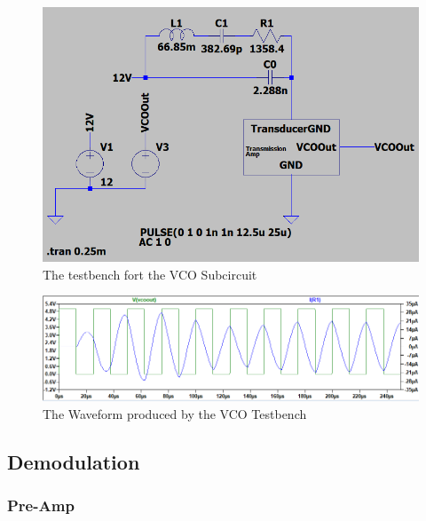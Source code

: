 \begin{figure}[H]
    \centering 
    \includegraphics[width=\textwidth]{../Circuits/Images/TransmissionAmp/TestBenchScreencap}
    \caption{The testbench fort the VCO Subcircuit}
    \label{fig:TransmissionAmpTestBench}
\end{figure}

\begin{figure}[H]
    \centering 
    \includegraphics[width=\textwidth]{../Circuits/Images/TransmissionAmp/TestBenchWaveform}
    \caption{The Waveform produced by the VCO Testbench}
    \label{fig:TransmissionAmpTestBenchWaveform}
\end{figure}

\subsection{Demodulation}

\subsubsection{Pre-Amp}
